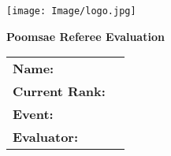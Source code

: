 \documentclass[10pt]{article}
\begin{document}
\begin{minipage}{0.2\textwidth}
    \texttt{[image: Image/logo.jpg]}
\end{minipage}
\begin{minipage}{0.75\textwidth}
    \begin{center}
        \textbf{\Huge Poomsae Referee Evaluation}
    \end{center}
    
    \begin{tabular}{p{} p{}}
        \textbf{Name:} & \hrulefill \\
        \textbf{Current Rank:} & \hrulefill \\
        \textbf{Event:} & \hrulefill \\
        \textbf{Evaluator:} & \hrulefill \\
    \end{tabular}
\end{minipage}

\vspace{0.02\textwidth}
\end{document}

